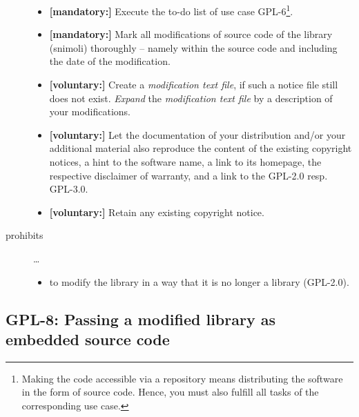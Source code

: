 \begin{description}
\begin{itemize}
  \item \textbf{[mandatory:]} Execute the to-do list of use case GPL-6\footnote{
  Making the code accessible via a repository means distributing the software in
  the form of source code. Hence, you must also fulfill all tasks of the
  corresponding use case.}.

  \item \textbf{[mandatory:]} Mark all modifications of source code of the
  library (snimoli) thoroughly -- namely within the source code and including
  the date of the modification.
  
  \item \textbf{[voluntary:]} Create a \emph{modification text file}, if such a
  notice file still does not exist. \emph{Expand} the \emph{modification text
  file} by a description of your modifications.

  \item \textbf{[voluntary:]} Let the documentation of your distribution and/or
  your additional material also reproduce the content of the existing
  copyright notices, a hint to the software name, a link to its homepage,
  the respective disclaimer of warranty, and a link to the GPL-2.0 resp.
  GPL-3.0.
  
  \item \textbf{[voluntary:]} Retain any existing copyright notice. 
  
\end{itemize}

\item[prohibits] \ldots
\begin{itemize}
  \item to modify the library in a way that it is no longer a library
  (GPL-2.0).
\end{itemize}

\end{description}

\subsection{GPL-8: Passing a modified library as embedded source code}
\label{OSUC-10-GPL}

